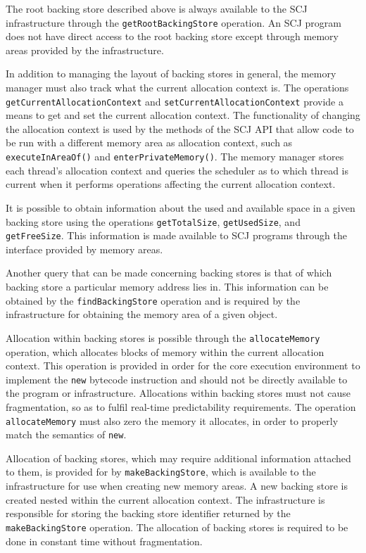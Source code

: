 \documentclass[a4paper,10pt]{report}
\begin{document}
The root backing store described above is always available to the SCJ
infrastructure through the \texttt{get\-Root\-Backing\-Store} operation. An SCJ
program does not have direct access to the root backing store except through
memory areas provided by the infrastructure.

In addition to managing the layout of backing stores in general, the memory
manager must also track what the current allocation context is. The operations
\texttt{get\-Cur\-rent\-Allo\-cation\-Con\-text} and
\texttt{set\-Cur\-rent\-Allo\-cation\-Con\-text} provide a means to get and set the
current allocation context. The functionality of changing the allocation context
is used by the methods of the SCJ API that allow code to be run with a different
memory area as allocation context, such as \texttt{execute\-In\-Area\-Of()} and
\texttt{enter\-Private\-Memory()}. The memory manager stores each thread's
allocation context and queries the scheduler as to which thread is current when
it performs operations affecting the current allocation context.

It is possible to obtain information about the used and available space in a given
backing store using the operations \texttt{get\-Total\-Size},
\texttt{get\-Used\-Size}, and \texttt{get\-Free\-Size}. This information is made
available to SCJ programs through the interface provided by memory areas.

Another query that can be made concerning backing stores is that of which
backing store a particular memory address lies in. This information can be
obtained by the \texttt{find\-Backing\-Store} operation and is required by the
infrastructure for obtaining the memory area of a given object.

Allocation within backing stores is possible through the
\texttt{allo\-cate\-Memory} operation, which allocates blocks of memory within
the current allocation context. This operation is provided in order for the core
execution environment to implement the \texttt{new} bytecode instruction and
should not be directly available to the program or infrastructure. Allocations
within backing stores must not cause fragmentation, so as to fulfil real-time
predictability requirements. The operation \texttt{allo\-cate\-Memory} must also
zero the memory it allocates, in order to properly match the semantics of
\texttt{new}.
 
Allocation of backing stores, which may require additional information attached
to them, is provided for by \texttt{make\-Back\-ing\-Store}, which is available
to the infrastructure for use when creating new memory areas. A new backing
store is created nested within the current allocation context. The
infrastructure is responsible for storing the backing store identifier returned
by the \texttt{make\-Backing\-Store} operation. The allocation of backing stores
is required to be done in constant time without fragmentation.
\end{document}
